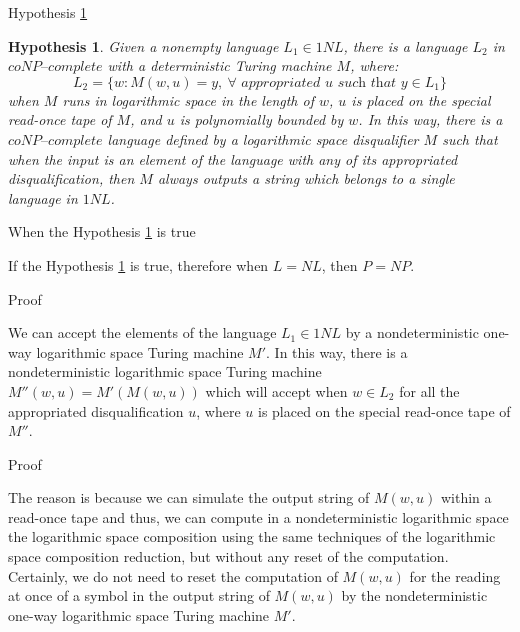 \documentclass[11pt]{beamer}
\newtheorem{hypothesis}[theorem]{Hypothesis}
\begin{document}
\begin{frame}{Hypothesis \ref{hypothesis2}}

\begin{hypothesis}
\label{hypothesis2}
Given a nonempty language $L_{1} \in 1NL$, there is a language $L_{2}$ in $\textit{coNP--complete}$ with a deterministic Turing machine $M$, where:
\[L_{2} = \{w: M(w, u) = y, \ \forall \textit{ appropriated } u \textit{ such that } y \in L_{1}\}\]
when $M$ runs in logarithmic space in the length of $w$, $u$ is placed on the special read-once tape of $M$, and $u$ is polynomially bounded by $w$. In this way, there is a $\textit{coNP--complete}$ language defined by a logarithmic space disqualifier $M$ such that when the input is an element of the language with any of its appropriated disqualification, then $M$ always outputs a string which belongs to a single language in $1NL$.
\end{hypothesis}

\end{frame}

\begin{frame}{When the Hypothesis \ref{hypothesis2} is true}

\begin{theorem}
\label{pos-implication}
If the Hypothesis \ref{hypothesis2} is true, therefore when $L = NL$, then $P = NP$.
\end{theorem}

\end{frame}

\begin{frame}{Proof}

We can accept the elements of the language $L_{1} \in 1NL$ by a nondeterministic one-way logarithmic space Turing machine $M'$. In this way, there is a nondeterministic logarithmic space Turing machine $M''(w, u) = M'(M(w, u))$ which will accept when $w \in L_{2}$ for all the appropriated disqualification $u$, where $u$ is placed on the special read-once tape of $M''$.

\end{frame}

\begin{frame}{Proof}

The reason is because we can simulate the output string of $M(w, u)$ within a read-once tape and thus, we can compute in a nondeterministic logarithmic space the logarithmic space composition using the same techniques of the logarithmic space composition reduction, but without any reset of the computation. Certainly, we do not need to reset the computation of $M(w, u)$ for the reading at once of a symbol in the output string of $M(w, u)$ by the nondeterministic one-way logarithmic space Turing machine $M'$.

\end{frame}
\end{document}
